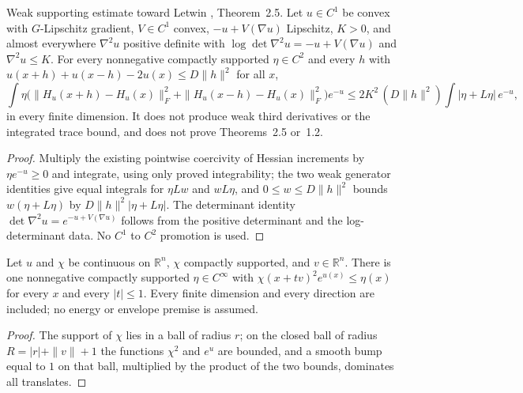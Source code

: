 \begin{lemma}
  \label{lem:letwin-hessian-increment-energy}
  \leanok
  Weak supporting estimate toward Letwin \cite{Letwin2026QuadraticKLS}, Theorem~2.5. Let $u\in C^1$ be convex with
  $G$-Lipschitz gradient, $V\in C^1$ convex, $-u+V(\nabla u)$ Lipschitz, $K>0$, and almost everywhere $\nabla^2u$ positive
  definite with $\log\det\nabla^2u=-u+V(\nabla u)$ and $\nabla^2u\le K$. For every nonnegative compactly supported
  $\eta\in C^2$ and every $h$ with $u(x+h)+u(x-h)-2u(x)\le D\|h\|^2$ for all $x$,
  \[
    \int\eta\bigl(\|H_u(x+h)-H_u(x)\|_F^2+\|H_u(x-h)-H_u(x)\|_F^2\bigr)e^{-u}
    \le 2K^2\,(D\|h\|^2)\int|\eta+L\eta|\,e^{-u},
  \]
  in every finite dimension. It does not produce weak third derivatives or the
  integrated trace bound, and does not prove Theorems~2.5 or~1.2.
\end{lemma}
\begin{proof}
  \leanok
  Multiply the existing pointwise coercivity of Hessian increments by $\eta e^{-u}\ge0$ and integrate, using only proved
  integrability; the two weak generator identities give equal integrals for $\eta Lw$ and $wL\eta$, and $0\le w\le D\|h\|^2$
  bounds $w(\eta+L\eta)$ by $D\|h\|^2|\eta+L\eta|$. The determinant identity $\det\nabla^2u=e^{-u+V(\nabla u)}$ follows from the
  positive determinant and the log-determinant data. No $C^1$ to $C^2$ promotion is used.
\end{proof}

\begin{lemma}
  \label{lem:uniform-translated-cutoff-majorant}
  \leanok
  Let $u$ and $\chi$ be continuous on $\mathbb R^n$, $\chi$ compactly supported, and $v\in\mathbb R^n$. There is one
  nonnegative compactly supported $\eta\in C^\infty$ with $\chi(x+tv)^2e^{u(x)}\le\eta(x)$ for every $x$ and every $|t|\le1$.
  Every finite dimension and every direction are included; no energy or envelope premise is assumed.
\end{lemma}
\begin{proof}
  \leanok
  The support of $\chi$ lies in a ball of radius $r$; on the closed ball of radius $R=|r|+\|v\|+1$ the functions $\chi^2$ and
  $e^u$ are bounded, and a smooth bump equal to $1$ on that ball, multiplied by the product of the two bounds, dominates all
  translates.
\end{proof}

